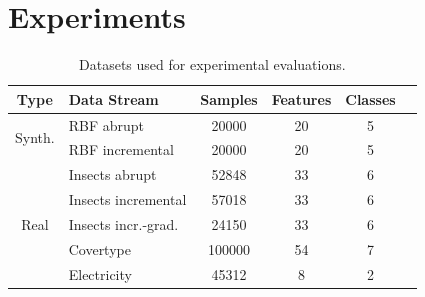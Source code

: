 \documentclass[letterpaper]{article} %
\begin{document}
\section{Experiments}\label{sec:experiments}

\begin{table}[ht]
	\small
	\begin{tabular}{@{}clcccc@{}}
		\toprule
		Type                    & Data Stream            & Samples & Features & Classes \\
		\midrule
		\multirow{2}{*}{Synth.} & RBF abrupt             & 20000   & 20       & 5       \\
		                        & RBF incremental        & 20000   & 20       & 5       \\
		\midrule
		\multirow{5}{*}{Real}   & Insects abrupt         & 52848   & 33       & 6       \\
		                        & Insects incremental    & 57018   & 33       & 6       \\
		                        & Insects incr.-grad.    & 24150   & 33       & 6       \\
		                        & Covertype\footnotemark & 100000  & 54       & 7       \\
		                        & Electricity            & 45312   & 8        & 2       \\
		\bottomrule
	\end{tabular}\label{tab:datasets}
	\caption{Datasets used for experimental evaluations.}
\end{table}

\end{document}
